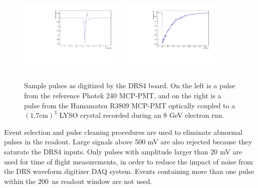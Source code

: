 \documentclass[12pt]{article}
\begin{document}
\begin{figure}[h] \centering
\includegraphics[width=0.45\textwidth]{figs/RefPulse} 
\includegraphics[width=0.45\textwidth]{figs/run064_event506} 
\caption{Sample pulses as digitized by the DRS4 board. 
On the left is a  pulse from the reference Photek 240 MCP-PMT, 
and on the right is a pulse from the Hamamatsu R3809 MCP-PMT
optically coupled to a $(1.7\mathrm{ cm})^3$ LYSO crystal 
recorded during an 8 GeV electron run.} 
\label{fig:PulseShapes}
\end{figure}

Event selection and pulse cleaning procedures are used to eliminate abnormal
pulses in the readout. Large signals above 500 mV are also rejected because
they saturate the DRS4 inputs. Only pulses with amplitude 
larger than 20 mV are used for time of flight measurements, in order to 
reduce the impact of noise from the DRS waveform digitizer DAQ system. 
Events containing more than one pulse within the $200$~ns readout window are
not used. 
\end{document}
